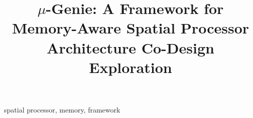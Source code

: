 \documentclass[conference]{IEEEtran}
\def \frameworkname {$\mu$-Genie}
\begin{document}
\title{\frameworkname: A Framework for Memory-Aware Spatial Processor Architecture Co-Design Exploration}



\maketitle


\begin{IEEEkeywords}
spatial processor, memory, framework
\end{IEEEkeywords}


















\vspace{12pt}
\end{document}
